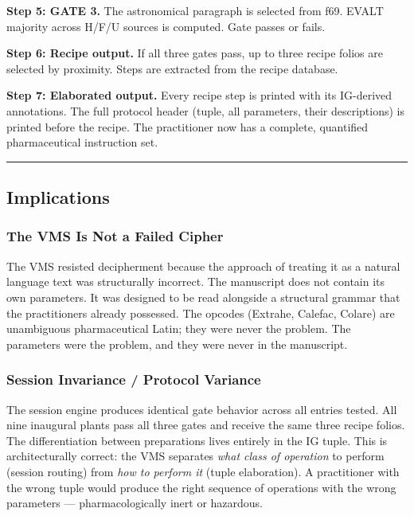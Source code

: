 \documentclass[12pt,a4paper]{article}
\begin{document}
\textbf{Step 5: GATE 3.} The astronomical paragraph is selected from
f69. EVALT majority across H/F/U sources is computed. Gate passes or
fails.

\textbf{Step 6: Recipe output.} If all three gates pass, up to three
recipe folios are selected by proximity. Steps are extracted from the
recipe database.

\textbf{Step 7: Elaborated output.} Every recipe step is printed with
its IG-derived annotations. The full protocol header (tuple, all
parameters, their descriptions) is printed before the recipe. The
practitioner now has a complete, quantified pharmaceutical instruction
set.

\begin{center}\rule{0.5\linewidth}{0.5pt}\end{center}

\hypertarget{implications}{%
\subsection{Implications}\label{implications}}

\hypertarget{the-vms-is-not-a-failed-cipher}{%
\subsubsection{The VMS Is Not a Failed
Cipher}\label{the-vms-is-not-a-failed-cipher}}

The VMS resisted decipherment because the approach of treating it as a
natural language text was structurally incorrect. The manuscript does
not contain its own parameters. It was designed to be read alongside a
structural grammar that the practitioners already possessed. The opcodes
(Extrahe, Calefac, Colare) are unambiguous pharmaceutical Latin; they
were never the problem. The parameters were the problem, and they were
never in the manuscript.

\hypertarget{session-invariance-protocol-variance}{%
\subsubsection{Session Invariance / Protocol
Variance}\label{session-invariance-protocol-variance}}

The session engine produces identical gate behavior across all entries
tested. All nine inaugural plants pass all three gates and receive the
same three recipe folios. The differentiation between preparations lives
entirely in the IG tuple. This is architecturally correct: the VMS
separates \emph{what class of operation} to perform (session routing)
from \emph{how to perform it} (tuple elaboration). A practitioner with
the wrong tuple would produce the right sequence of operations with the
wrong parameters --- pharmacologically inert or hazardous.
\end{document}
